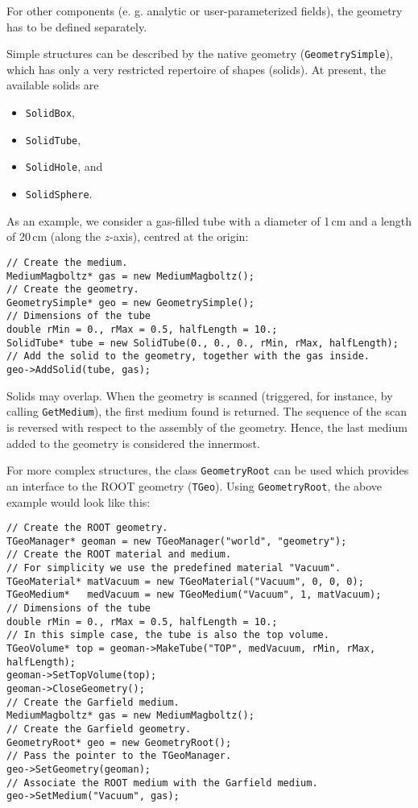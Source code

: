 For other components (e. g. analytic or user-parameterized fields), 
the geometry has to be defined separately. 

Simple structures can be described by the native geometry (\texttt{GeometrySimple}), which has only a very restricted repertoire of shapes (solids). 
At present, the available solids are
\begin{itemize}
  \item
  \texttt{SolidBox}, 
  \item
  \texttt{SolidTube}, 
  \item
  \texttt{SolidHole}, and
  \item
  \texttt{SolidSphere}.
\end{itemize} 

As an example, we consider a gas-filled tube with a diameter of 1\,cm and 
a length of 20\,cm (along the \(z\)-axis), centred at the origin:
\begin{lstlisting}
// Create the medium.
MediumMagboltz* gas = new MediumMagboltz();
// Create the geometry.
GeometrySimple* geo = new GeometrySimple();
// Dimensions of the tube
double rMin = 0., rMax = 0.5, halfLength = 10.;
SolidTube* tube = new SolidTube(0., 0., 0., rMin, rMax, halfLength);
// Add the solid to the geometry, together with the gas inside.
geo->AddSolid(tube, gas);
\end{lstlisting}

Solids may overlap. 
When the geometry is scanned 
(triggered, for instance, by calling \texttt{GetMedium}), the  
first medium found is returned. 
The sequence of the scan is reversed with respect to the 
assembly of the geometry. 
Hence, the last medium added to the geometry is considered the innermost. 

For more complex structures, the class \texttt{GeometryRoot} can be used 
which provides an interface to the ROOT geometry (\texttt{TGeo}).
Using \texttt{GeometryRoot}, the above example would look like this:
\begin{lstlisting}
// Create the ROOT geometry.
TGeoManager* geoman = new TGeoManager("world", "geometry");
// Create the ROOT material and medium. 
// For simplicity we use the predefined material "Vacuum".
TGeoMaterial* matVacuum = new TGeoMaterial("Vacuum", 0, 0, 0);
TGeoMedium*   medVacuum = new TGeoMedium("Vacuum", 1, matVacuum);
// Dimensions of the tube
double rMin = 0., rMax = 0.5, halfLength = 10.;
// In this simple case, the tube is also the top volume.
TGeoVolume* top = geoman->MakeTube("TOP", medVacuum, rMin, rMax, halfLength);
geoman->SetTopVolume(top);
geoman->CloseGeometry();
// Create the Garfield medium.
MediumMagboltz* gas = new MediumMagboltz();
// Create the Garfield geometry.
GeometryRoot* geo = new GeometryRoot();
// Pass the pointer to the TGeoManager.
geo->SetGeometry(geoman);
// Associate the ROOT medium with the Garfield medium.
geo->SetMedium("Vacuum", gas); 
\end{lstlisting} 


